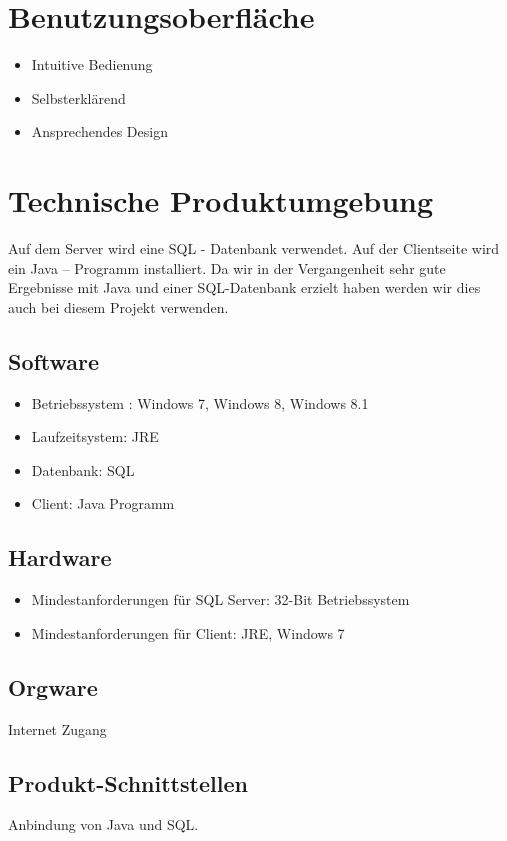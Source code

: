 \documentclass[a4paper,listof=leveldown,listof=numbered]{scrreprt}
\begin{document}
\chapter{Benutzungsoberfläche}
	\begin{itemize}
		\item Intuitive Bedienung
		\item Selbsterklärend
		\item Ansprechendes Design
	\end{itemize}
	
\chapter{Technische Produktumgebung}
	Auf dem Server wird eine SQL - Datenbank verwendet. Auf der Clientseite wird ein Java – Programm installiert. Da wir in der Vergangenheit sehr gute Ergebnisse mit Java und einer SQL-Datenbank erzielt haben werden wir dies auch bei diesem Projekt verwenden.
	
	\section{Software}
	\begin{itemize}
		\item Betriebssystem : Windows 7, Windows 8, Windows 8.1
		\item Laufzeitsystem: JRE
		\item Datenbank: SQL
		\item Client: Java Programm
	\end{itemize}

	\section{Hardware}
	\begin{itemize}
		\item Mindestanforderungen für SQL Server: 32-Bit Betriebssystem
		\item Mindestanforderungen für Client: JRE, Windows 7
	\end{itemize}

	\section{Orgware}
	Internet Zugang
	
	\section{Produkt-Schnittstellen}
	Anbindung von Java und SQL.
	
\end{document}
